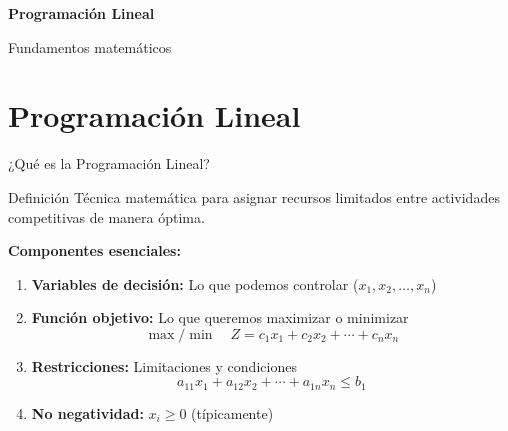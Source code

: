 \documentclass[aspectratio=169,10pt]{beamer}
\begin{document}
\begin{frame}
\begin{center}
\vspace{1.5cm}
\Huge \textbf{Programación Lineal}

\vspace{0.5cm}
\Large Fundamentos matemáticos
\end{center}
\end{frame}

\section{Programación Lineal}

\begin{frame}{¿Qué es la Programación Lineal?}

\begin{block}{Definición}
Técnica matemática para asignar recursos limitados entre actividades competitivas de manera óptima.
\end{block}

\vspace{0.3cm}

\textbf{Componentes esenciales:}

\begin{enumerate}
    \item \textbf{Variables de decisión:} Lo que podemos controlar ($x_1, x_2, \ldots, x_n$)
    \item \textbf{Función objetivo:} Lo que queremos maximizar o minimizar
    $$\max/\min \quad Z = c_1x_1 + c_2x_2 + \cdots + c_nx_n$$
    \item \textbf{Restricciones:} Limitaciones y condiciones
    $$a_{11}x_1 + a_{12}x_2 + \cdots + a_{1n}x_n \leq b_1$$
    \item \textbf{No negatividad:} $x_i \geq 0$ (típicamente)
\end{enumerate}

\end{frame}
\end{document}

